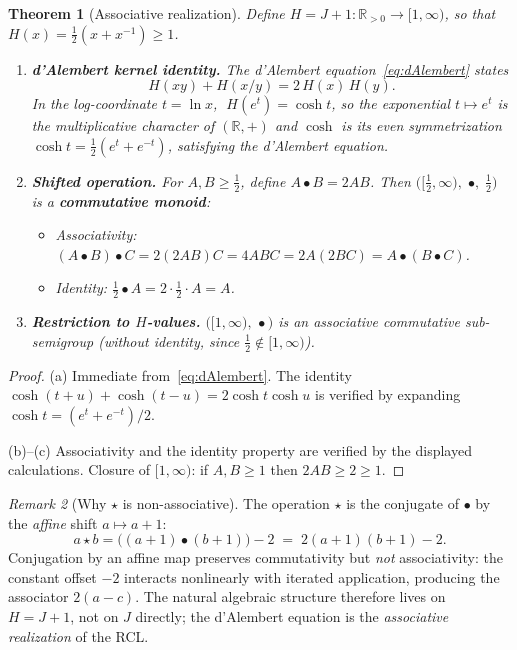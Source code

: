 \documentclass[11pt,a4paper]{article}
\theoremstyle{plain}
\newtheorem{theorem}{Theorem}[section]
\theoremstyle{definition}
\theoremstyle{remark}
\newtheorem{remark}[theorem]{Remark}
\newcommand{\Jcost}{J}
\newcommand{\RR}{\mathbb{R}}
\begin{document}
\begin{theorem}[Associative realization]\label{thm:shifted-monoid}
Define $H=\Jcost+1:\RR_{>0}\to[1,\infty)$, so that
$H(x)=\tfrac12(x+x^{-1})\ge1$.
\begin{enumerate}[nosep,label=\textup{(\alph*)}]
\item \textbf{d'Alembert kernel identity.}
  The d'Alembert equation~\eqref{eq:dAlembert} states
  \[
    H(xy)+H(x/y)=2\,H(x)\,H(y).
  \]
  In the log-coordinate $t=\ln x$, $\;H(e^t)=\cosh t$, so
  the exponential $t\mapsto e^t$ is the multiplicative character of
  $(\RR,+)$ and $\cosh$ is its even symmetrization
  $\cosh t=\tfrac12(e^t+e^{-t})$, satisfying the d'Alembert equation.
\item \textbf{Shifted operation.}
  For $A,B\ge\tfrac12$, define $A\bullet B=2AB$.  Then
  $\bigl([\tfrac12,\infty),\;\bullet,\;\tfrac12\bigr)$ is a
  \textbf{commutative monoid}:
  \begin{itemize}[nosep]
  \item \emph{Associativity:}
    $(A\bullet B)\bullet C = 2(2AB)C = 4ABC
     = 2A(2BC) = A\bullet(B\bullet C)$.
  \item \emph{Identity:}
    $\tfrac12\bullet A = 2\cdot\tfrac12\cdot A = A$.
  \end{itemize}
\item \textbf{Restriction to $H$-values.}
  $\bigl([1,\infty),\,\bullet\bigr)$ is an associative commutative
  sub-semigroup (without identity, since $\tfrac12\notin[1,\infty)$).
\end{enumerate}
\end{theorem}

\begin{proof}
(a) Immediate from~\eqref{eq:dAlembert}.  The identity
$\cosh(t{+}u)+\cosh(t{-}u)=2\cosh t\cosh u$ is verified by
expanding $\cosh t=(e^t+e^{-t})/2$.

(b)--(c) Associativity and the identity property are verified
by the displayed calculations.  Closure of $[1,\infty)$: if
$A,B\ge1$ then $2AB\ge2\ge1$.
\end{proof}

\begin{remark}[Why $\star$ is non-associative]\label{rem:why-nonassoc}
The operation $\star$ is the conjugate of $\bullet$ by the
\emph{affine} shift $a\mapsto a+1$:
\[
  a\star b = \bigl((a{+}1)\bullet(b{+}1)\bigr)-2
  \;=\; 2(a{+}1)(b{+}1)-2.
\]
Conjugation by an affine map preserves commutativity but \emph{not}
associativity: the constant offset $-2$ interacts nonlinearly with
iterated application, producing the associator $2(a{-}c)$.
The natural algebraic structure therefore lives on $H=\Jcost+1$,
not on $\Jcost$ directly; the d'Alembert equation is the
\emph{associative realization} of the RCL.
\end{remark}
\end{document}
